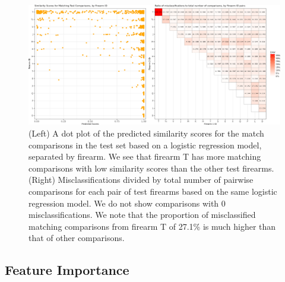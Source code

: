 \documentclass[reprint]{JASA}
\begin{document}
\begin{figure}[htbp]

{\centering \includegraphics[width=\textwidth]{images/resultsPlots/misclassifPlt} 

}

\caption{\label{fig:testProbs-byFirearm} (Left) A dot plot of the predicted similarity scores for the match comparisons in the test set based on a logistic regression model, separated by firearm. We see that firearm T has more matching comparisons with low similarity scores than the other test firearms. (Right) Misclassifications divided by total number of pairwise comparisons for each pair of test firearms based on the same logistic regression model. We do not show comparisons with 0 misclassifications. We note that the proportion of misclassified matching comparisons from firearm T of 27.1\% is much higher than that of other comparisons.}\label{fig:unnamed-chunk-11}
\end{figure}

\hypertarget{feature-importance}{%
\subsection{Feature Importance}\label{feature-importance}}
\end{document}
